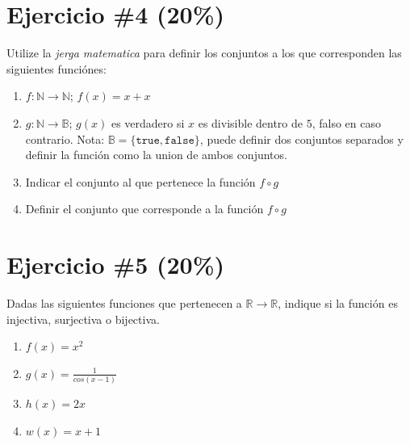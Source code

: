 \documentclass{article}
\begin{document}
\section*{Ejercicio \#4 (20\%)}
Utilize la \emph{jerga matematica} para definir los conjuntos a los que corresponden las
siguientes funci\'ones:
\begin{enumerate}
        \item{$f:\mathbb{N}\rightarrow\mathbb{N}$; $f(x)=x+x$}
        \item{$g:\mathbb{N}\rightarrow\mathbb{B}$; $g(x)$ es verdadero si
        $x$ es divisible dentro de $5$, falso en caso contrario. Nota: $\mathbb{B}=
        \{\mathtt{true},\mathtt{false}\}$, puede definir dos conjuntos separados y
        definir la funci\'on como la union de ambos conjuntos.}
        \item{Indicar el conjunto al que pertenece la funci\'on $f\circ g$}
        \item{Definir el conjunto que corresponde a la funci\'on $f\circ g$}
\end{enumerate}

\section*{Ejercicio \#5 (20\%)}
Dadas las siguientes funciones que pertenecen a $\mathbb{R}\rightarrow \mathbb{R}$, indique
si la funci\'on es injectiva, surjectiva o bijectiva.
\begin{enumerate}
        \item{$f(x)=x^2$}
        \item{$g(x)=\frac{1}{cos(x-1)}$}
        \item{$h(x)=2x$}
        \item{$w(x)=x+1$}
\end{enumerate}
\end{document}
